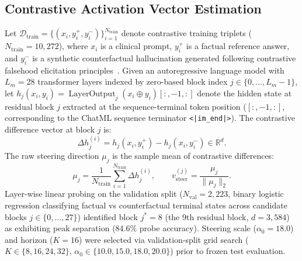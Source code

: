 \documentclass[runningheads]{llncs}
\begin{document}
\subsection{Contrastive Activation Vector Estimation}
Let $\mathcal{D}_{\text{train}} = \{(x_i, y_i^+, y_i^-)\}_{i=1}^{N_{\text{train}}}$ denote contrastive training triplets ($N_{\text{train}}=10,272$), where $x_i$ is a clinical prompt, $y_i^+$ is a factual reference answer, and $y_i^-$ is a synthetic counterfactual hallucination generated following contrastive falsehood elicitation principles~\cite{ref16}. Given an autoregressive language model with $L_m=28$ transformer layers indexed by zero-based block index $j \in \{0, \dots, L_m-1\}$, let $h_j(x_i, y_i) = \operatorname{LayerOutput}_j(x_i \oplus y_i)[:, -1, :]$ denote the hidden state at residual block $j$ extracted at the sequence-terminal token position ($[:, -1, :]$, corresponding to the ChatML sequence terminator \texttt{<|im\_end|>}). The contrastive difference vector at block $j$ is:
\begin{equation}
\Delta h_j^{(i)} = h_j(x_i, y_i^+) - h_j(x_i, y_i^-) \in \mathbb{R}^d.
\end{equation}
The raw steering direction $\mu_j$ is the sample mean of contrastive differences:
\begin{equation}
\mu_j = \frac{1}{N_{\text{train}}} \sum_{i=1}^{N_{\text{train}}} \Delta h_j^{(i)}, \qquad v_{\text{steer}}^{(j)} = \frac{\mu_j}{\|\mu_j\|_2}.
\end{equation}
Layer-wise linear probing on the validation split ($N_{\text{val}}=2,223$, binary logistic regression classifying factual vs counterfactual terminal states across candidate blocks $j \in \{0, \dots, 27\}$) identified block $j^*=8$ (the 9th residual block, $d=3,584$) as exhibiting peak separation (84.6\% probe accuracy). Steering scale ($\alpha_0=18.0$) and horizon ($K=16$) were selected via validation-split grid search ($K \in \{8, 16, 24, 32\}$, $\alpha_0 \in \{10.0, 15.0, 18.0, 20.0\}$) prior to frozen test evaluation.
\end{document}
